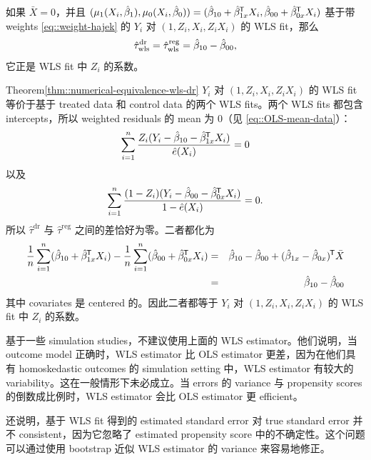  

\begin{theorem}
\label{thm::numerical-equivalence-wls-dr}
如果 $\bar{X}=0$，并且 $( \mu_1(X_i, \hat{\beta}_1),  \mu_0(X_i, \hat{\beta}_0)) = (  \hat \beta_{10} +   \hat \beta_{1x}^{\mkern-1.5mu\mathsf{T}} X_i ,   \hat \beta_{00} +   \hat\beta_{0x}^{\mkern-1.5mu\mathsf{T}} X_i )$ 基于带 weights \eqref{eq::weight-hajek} 的 $Y_i$ 对 $(1,Z_i, X_i, Z_iX_i)$ 的 WLS fit，那么
$$
\hat{\tau}^\textup{dr}_\textup{wls}  = \hat{\tau}^\textup{reg}_\textup{wls} 
= \hat \beta_{10} - \hat \beta_{00} ,
$$
它正是 WLS fit 中 $Z_i$ 的系数。
\end{theorem}

\begin{myproof}{Theorem}{\ref{thm::numerical-equivalence-wls-dr}}
$Y_i$ 对 $(1,Z_i, X_i, Z_iX_i)$ 的 WLS fit 等价于基于 treated data 和 control data 的两个 WLS fits。两个 WLS fits 都包含 intercepts，所以 weighted residuals 的 mean 为 0（见 \eqref{eq::OLS-mean-data}）：
$$
\sum_{i=1}^n  \frac{Z_i ( Y_i- \hat \beta_{10} -  \hat \beta_{1x}^{\mkern-1.5mu\mathsf{T}} X_i ) }{  \hat{e}(X_i) }   =0 
$$
以及
$$
\sum_{i=1}^n  \frac{(1-Z_i) (  Y_i-\hat \beta_{00}  -   \hat\beta_{0x}^{\mkern-1.5mu\mathsf{T}} X_i   ) }{  1-\hat{e}(X_i) }  = 0 .
$$
所以 $\hat{\tau}^\text{dr} $ 与 $\hat{\tau}^\text{reg}$ 之间的差恰好为零。二者都化为
\begin{eqnarray*}
 \frac{1}{n} \sum_{i=1}^n (\hat \beta_{10} +   \hat \beta_{1x}^{\mkern-1.5mu\mathsf{T}} X_i)   - \frac{1}{n} \sum_{i=1}^n (\hat \beta_{00} +   \hat\beta_{0x}^{\mkern-1.5mu\mathsf{T}} X_i)  
&=& \hat \beta_{10} - \hat \beta_{00}  + (\hat \beta_{1x} - \hat\beta_{0x})^{\mkern-1.5mu\mathsf{T}} \bar{X} \\
&=&\hat \beta_{10} - \hat \beta_{00}
\end{eqnarray*}
其中 covariates 是 centered 的。因此二者都等于 $Y_i$ 对 $(1,Z_i, X_i, Z_iX_i)$ 的 WLS fit 中 $Z_i$ 的系数。
\end{myproof} 


\citet{freedman2008weighting} 基于一些 simulation studies，不建议使用上面的 WLS estimator。他们说明，当 outcome model 正确时，WLS estimator 比 OLS estimator 更差，因为在他们具有 homoskedastic outcomes 的 simulation setting 中，WLS estimator 有较大的 variability。这在一般情形下未必成立。当 errors 的 variance 与 propensity scores 的倒数成比例时，WLS estimator 会比 OLS estimator 更 efficient。

\citet{freedman2008weighting} 还说明，基于 WLS fit 得到的 estimated standard error 对 true standard error 并不 consistent，因为它忽略了 estimated propensity score 中的不确定性。这个问题可以通过使用 bootstrap 近似 WLS estimator 的 variance 来容易地修正。


